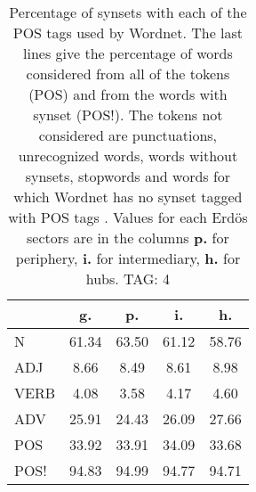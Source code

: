 \begin{table}[h!]
\begin{center}
\begin{tabular}{| l | c | c | c | c |}\hline
 & g. & p. & i. & h. \\\hline
N & 61.34  & 63.50  & 61.12  & 58.76 \\\hline
ADJ & 8.66  & 8.49  & 8.61  & 8.98 \\\hline
VERB & 4.08  & 3.58  & 4.17  & 4.60 \\\hline
ADV & 25.91  & 24.43  & 26.09  & 27.66 \\\hline
POS & 33.92  & 33.91  & 34.09  & 33.68 \\\hline
POS! & 94.83  & 94.99  & 94.77  & 94.71 \\\hline
\end{tabular}
\caption{Percentage of synsets with each of the POS tags used by Wordnet. The last lines give the percentage of words considered from all of the tokens (POS) and from the words with synset (POS!). The tokens not considered are punctuations, unrecognized words, words without synsets, stopwords and words for which Wordnet has no synset  tagged with POS tags . Values for each Erd\"os sectors are in the columns {{\bf p.}} for periphery, {{\bf i.}} for intermediary, {{\bf h.}} for hubs. TAG: 4}
\end{center}
\end{table}